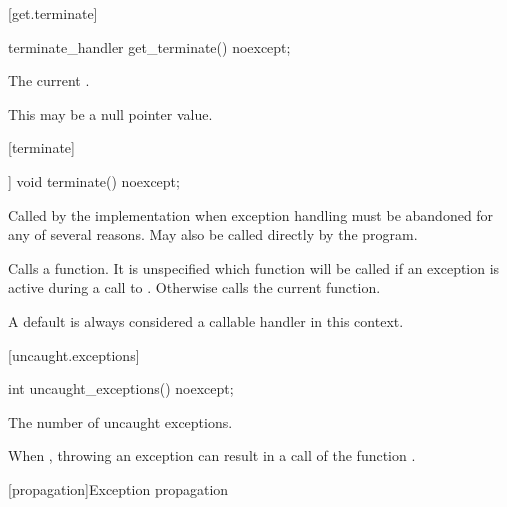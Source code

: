 [get.terminate]{}

%
\begin{itemdecl}
terminate_handler get_terminate() noexcept;
\end{itemdecl}

\begin{itemdescr}
\pnum
\returns The current .
\begin{note} This may be a null pointer value. \end{note}
\end{itemdescr}

[terminate]{}

%
\begin{itemdecl}
[[noreturn]] void terminate() noexcept;
\end{itemdecl}

\begin{itemdescr}
\pnum
\remarks
Called by the implementation when exception
handling must be abandoned for any of several reasons.
May also be called directly by the program.

\pnum
\effects
Calls a  function. It is unspecified which
 function will be called if an exception is active
during a call to .
Otherwise calls the current  function. \begin{note} A
default  is always considered a callable handler in
this context. \end{note}
\end{itemdescr}

[uncaught.exceptions]{}

%
\begin{itemdecl}
int uncaught_exceptions() noexcept;
\end{itemdecl}

\begin{itemdescr}
\pnum
\returns
The number of uncaught exceptions.

\pnum
\remarks
When ,
throwing an exception can result in a call of the function
.
\end{itemdescr}

[propagation]{Exception propagation}

